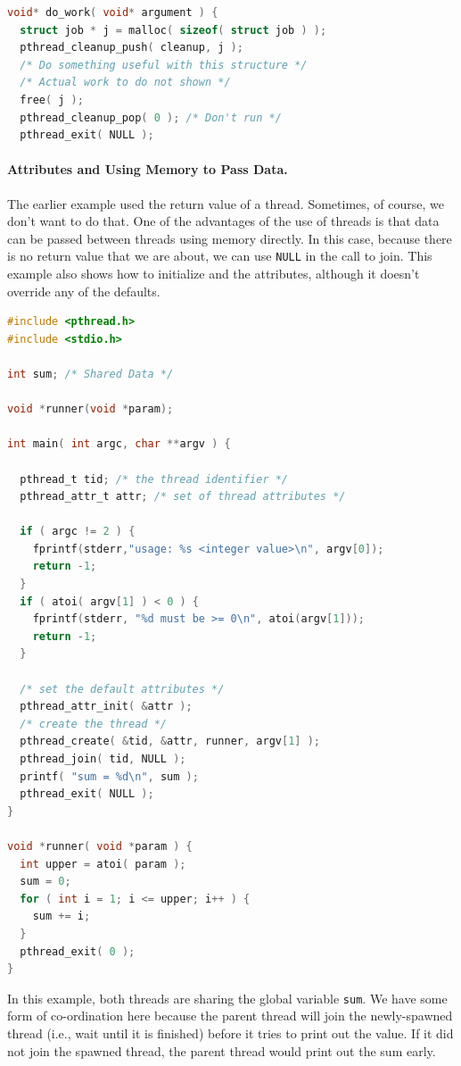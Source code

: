 \documentclass[a4paper]{report}
\begin{document}
\begin{appendices}
\begin{lstlisting}[language=C]
void* do_work( void* argument ) {
  struct job * j = malloc( sizeof( struct job ) );
  pthread_cleanup_push( cleanup, j );
  /* Do something useful with this structure */
  /* Actual work to do not shown */
  free( j );
  pthread_cleanup_pop( 0 ); /* Don't run */
  pthread_exit( NULL );
\end{lstlisting}

\paragraph{Attributes and Using Memory to Pass Data.}
The earlier example used the return value of a thread. Sometimes, of course, we don't want to do that. One of the advantages of the use of threads is that data can be passed between threads using memory directly. In this case, because there is no return value that we are about, we can use \texttt{NULL} in the call to join. This example also shows how to initialize and the attributes, although it doesn't override any of the defaults.


\begin{lstlisting}[language=C]
#include <pthread.h>
#include <stdio.h>

int sum; /* Shared Data */

void *runner(void *param);

int main( int argc, char **argv ) {

  pthread_t tid; /* the thread identifier */
  pthread_attr_t attr; /* set of thread attributes */

  if ( argc != 2 ) {
    fprintf(stderr,"usage: %s <integer value>\n", argv[0]); 
    return -1;
  }
  if ( atoi( argv[1] ) < 0 ) {
    fprintf(stderr, "%d must be >= 0\n", atoi(argv[1])); 
    return -1;
  }

  /* set the default attributes */
  pthread_attr_init( &attr );
  /* create the thread */
  pthread_create( &tid, &attr, runner, argv[1] );
  pthread_join( tid, NULL ); 
  printf( "sum = %d\n", sum );
  pthread_exit( NULL );
}

void *runner( void *param ) {
  int upper = atoi( param );
  sum = 0;
  for ( int i = 1; i <= upper; i++ ) {
    sum += i;
  }
  pthread_exit( 0 );
}
\end{lstlisting}

In this example, both threads are sharing the global variable \texttt{sum}. We have some form of co-ordination here because the parent thread will join the newly-spawned thread (i.e., wait until it is finished) before it tries to print out the value. If it did not join the spawned thread, the parent thread would print out the sum early. 




\end{appendices}
\end{document}
